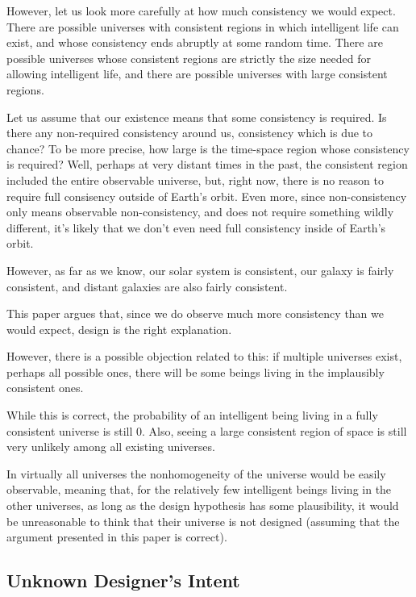 \documentclass[a4paper
,draft
]{article}
\newcommand{\paper}[1]{paper}
\begin{document}
However, let us look more carefully at how much consistency we would expect.
There are possible universes with consistent regions in which
intelligent life can exist, and whose consistency ends abruptly at some
random time. There are possible universes whose consistent regions are
strictly the size needed for allowing intelligent life, and there are possible
universes with large consistent regions.

Let us assume that our existence means that some consistency is required.
Is there any non-required consistency around us, consistency which is due to
chance? To be more precise,
how large is the time-space region whose consistency is required? Well,
perhaps at very distant times in the past, the consistent region included
the entire observable universe, but, right now, there is no reason to require
full consisency outside of Earth's orbit. Even more, since non-consistency
only means
observable non-consistency, and does not require something wildly different,
it's likely that we don't even need full consistency inside of Earth's orbit.

However, as far as we know, our solar system is consistent, our galaxy is
fairly consistent, and distant galaxies are also fairly consistent.

This \paper{} argues that, since we do observe much more consistency
than we would expect, design is the right explanation.

However, there is a possible objection related to this: if multiple universes
exist, perhaps all possible ones, there will be some beings living in the
implausibly consistent ones.

While this is correct, the probability of an intelligent being
living in a fully consistent universe is still $0$.
Also, seeing a large consistent region of space is still very unlikely among
all existing universes.

In virtually all universes the nonhomogeneity of the universe would be
easily observable, meaning that, for the relatively few intelligent beings
living in the other universes, as long as the design hypothesis
has some plausibility, it would be unreasonable to think that
their universe is not designed (assuming that the argument presented in
this \paper{} is correct).

\subsection{Unknown Designer's Intent}
\end{document}
